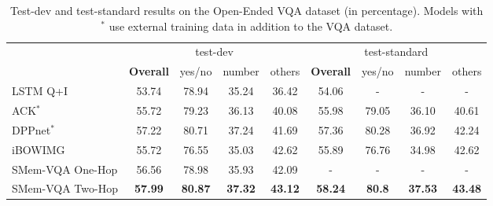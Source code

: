 \begin{table}[!t]
\centering
\caption{Test-dev and test-standard results on the Open-Ended VQA dataset (in percentage). Models with ${}^\ast$ use external training data in addition to the VQA dataset.}
\scriptsize
 \begin{tabular}{l || c c c c || c c c c} 
 \hline
 ~ & \multicolumn{4}{c||}{test-dev}  & \multicolumn{4}{c}{test-standard}\\ 
 ~ & \bf{Overall}  & yes/no  & number  & others & \bf{Overall}  & yes/no  & number  & others\\ \hline
 LSTM Q+I~\cite{DBLP:journals/corr/AntolALMBZP15} & 53.74 & 78.94  & 35.24  & 36.42 & 54.06 & -  & -  & -\\ %
 ACK${}^\ast$~\cite{wu2015ask} & 55.72 & 79.23  & 36.13  & 40.08 & 55.98 & 79.05  & 36.10  & 40.61\\ %
 DPPnet${}^\ast$~\cite{noh2015image} & 57.22 & 80.71  & 37.24  & 41.69 & 57.36 & 80.28  & 36.92  & 42.24\\ %
 iBOWIMG~\cite{zhou2015simple} & 55.72 & 76.55  & 35.03  & 42.62 & 55.89 & 76.76  & 34.98  & 42.62\\ \hline 
 SMem-VQA One-Hop & 56.56 & 78.98 & 35.93  & 42.09 & - & -  & -  & -\\ %
 SMem-VQA Two-Hop & \textbf{57.99} & \textbf{80.87}  & \textbf{37.32}  & \textbf{43.12} & \textbf{58.24} & \textbf{80.8}  & \textbf{37.53}  & \textbf{43.48}\\ \hline 
 \end{tabular}
\label{fig:baseline2}
\vspace{-0.15in}
\end{table}

